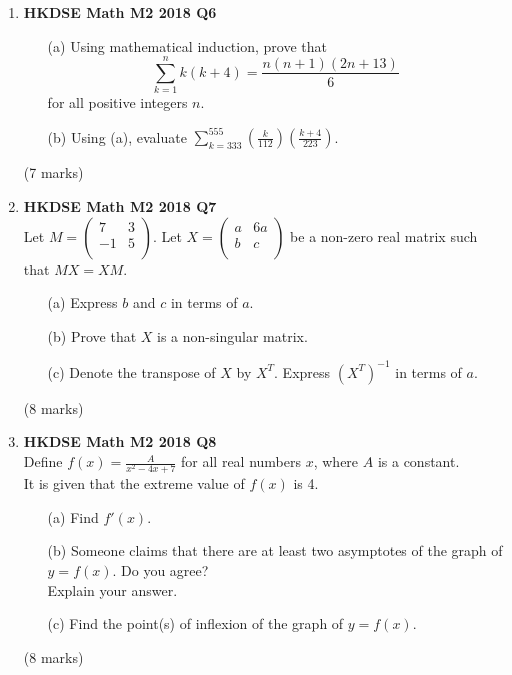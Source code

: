 \documentclass{report}
\begin{document}
\begin{enumerate}
	\item \textbf{HKDSE Math M2 2018 Q6}
	\begin{enumerate}
		\item [(a)]Using mathematical induction, prove that $$\displaystyle \sum_{k = 1}^{n} k(k+4) = \frac{n(n+1)(2n+13)}{6}$$ for all positive integers $n$.
		\item [(b)] Using (a), evaluate $\displaystyle \sum_{k = 333}^{555} \left(\frac{k}{112}\right)\left(\frac{k+4}{223}\right)$.
	\end{enumerate}
	(7 marks)

	\newpage

	\item \textbf{HKDSE Math M2 2018 Q7}\\
	Let $M = 
		\begin{pmatrix}
		7 &3 \\
		-1&5\\
		\end{pmatrix}$. Let $X = 
		\begin{pmatrix}
		a &6a \\
		b&c\\
		\end{pmatrix}$ be a non-zero real matrix such that $MX = XM$. 
	\begin{enumerate}
		\item[(a)]Express $b$ and $c$ in  terms of $a$. 
		\item[(b)]Prove that $X$ is a non-singular matrix.
		\item[(c)]Denote the transpose of $X$ by $X^T$. Express $(X^T)^{-1}$ in terms of $a$.
	\end{enumerate}
	(8 marks)

	\item \textbf{HKDSE Math M2 2018 Q8}\\
	Define $f(x) = \displaystyle \frac{A}{x^2-4x+7}$ for all real numbers $x$, where $A$ is a constant. \\
	It is given that the extreme value of $f(x)$ is 4. 
	\begin{enumerate}
		\item [(a)] Find $f'(x)$. 
		\item [(b)] Someone claims that there are at least two asymptotes of the graph of $ y =  f(x)$. Do you agree? \\
		Explain your answer. 
		\item [(c)] Find the point(s) of inflexion of the graph of $y =f(x)$.
	\end{enumerate}
	(8 marks)


\end{enumerate}
\end{document}
